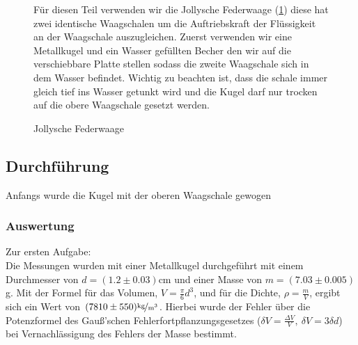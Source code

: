 \documentclass[11pt,a4paper]{article}
\begin{document}
\begin{figure}[h]
\begin{minipage}{.6\textwidth}
Für diesen Teil verwenden wir die Jollysche Federwaage (\ref{JS1}) diese hat zwei identische Waagschalen um die Auftriebskraft der Flüssigkeit an der Waagschale auszugleichen. Zuerst verwenden wir eine Metallkugel und ein Wasser gefüllten Becher den wir auf die verschiebbare Platte stellen sodass die zweite Waagschale sich in dem Wasser befindet.
 Wichtig zu beachten ist, dass die schale immer gleich tief ins Wasser getunkt wird und die Kugel darf nur trocken auf die obere Waagschale gesetzt werden.
\end{minipage}%
\begin{minipage}{.4\textwidth}
\centering
{}
   \renewcommand\thefigure{B1}
\caption[Jollysche Federwaage]{Jollysche Federwaage \cite{Anleitung}}
\label{JS1}

\end{minipage}
\end{figure}

\subsection{Durchführung}

Anfangs wurde die Kugel mit der oberen Waagschale gewogen 

\subsubsection{Auswertung}

Zur ersten Aufgabe:\\
Die Messungen wurden mit einer Metallkugel durchgef\"uhrt mit einem Durch\-messer von $d=(1.2\pm0.03)$cm und einer Masse von $m=(7.03\pm0.005)$g. Mit der Formel f\"ur das Volumen, $V=\frac{\pi}{6}d^3$, und f\"ur die Dichte, $\rho=\frac{m}{V}$, ergibt sich ein Wert von $(7810\pm550)\mathrm{\nicefrac{\textrm{kg}}{m^3}}$. Hierbei wurde der Fehler \"uber die Potenz\-formel des Gau\ss 'schen Fehlerfortpflanzungsgesetzes ($\delta V=\frac{\Delta V}{V},\ \delta V=3\delta d$) bei Vernachl\"assigung des Fehlers der Masse bestimmt.\\
\end{document}
